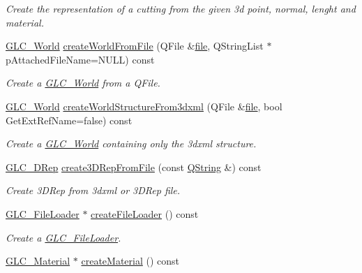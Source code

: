 \begin{DoxyCompactItemize}
\begin{DoxyCompactList}\small\item\em Create the representation of a cutting from the given 3d point, normal, lenght and material. \end{DoxyCompactList}\item 
\hyperlink{class_g_l_c___world}{G\-L\-C\-\_\-\-World} \hyperlink{class_g_l_c___factory_a0ca3d26bda97584f220eabfa43934410}{create\-World\-From\-File} (Q\-File \&\hyperlink{uavobjecttemplate_8m_a97c04efa65bcf0928abf9260bc5cbf46}{file}, Q\-String\-List $\ast$p\-Attached\-File\-Name=N\-U\-L\-L) const 
\begin{DoxyCompactList}\small\item\em Create a \hyperlink{class_g_l_c___world}{G\-L\-C\-\_\-\-World} from a Q\-File. \end{DoxyCompactList}\item 
\hyperlink{class_g_l_c___world}{G\-L\-C\-\_\-\-World} \hyperlink{class_g_l_c___factory_a9f5db8b22c52b376fce45422ce1e12a4}{create\-World\-Structure\-From3dxml} (Q\-File \&\hyperlink{uavobjecttemplate_8m_a97c04efa65bcf0928abf9260bc5cbf46}{file}, bool Get\-Ext\-Ref\-Name=false) const 
\begin{DoxyCompactList}\small\item\em Create a \hyperlink{class_g_l_c___world}{G\-L\-C\-\_\-\-World} containing only the 3dxml structure. \end{DoxyCompactList}\item 
\hyperlink{class_g_l_c__3_d_rep}{G\-L\-C\-\_\-D\-Rep} \hyperlink{class_g_l_c___factory_a567113bee0a4db892c7cb6e6b2d3bdc1}{create3\-D\-Rep\-From\-File} (const \hyperlink{group___u_a_v_objects_plugin_gab9d252f49c333c94a72f97ce3105a32d}{Q\-String} \&) const 
\begin{DoxyCompactList}\small\item\em Create 3\-D\-Rep from 3dxml or 3\-D\-Rep file. \end{DoxyCompactList}\item 
\hyperlink{class_g_l_c___file_loader}{G\-L\-C\-\_\-\-File\-Loader} $\ast$ \hyperlink{class_g_l_c___factory_a845ff89af102f0208412b5f47897ea77}{create\-File\-Loader} () const 
\begin{DoxyCompactList}\small\item\em Create a \hyperlink{class_g_l_c___file_loader}{G\-L\-C\-\_\-\-File\-Loader}. \end{DoxyCompactList}\item 
\hyperlink{class_g_l_c___material}{G\-L\-C\-\_\-\-Material} $\ast$ \hyperlink{class_g_l_c___factory_abc152d8b81c8ea84ed6fcb82d5ac868f}{create\-Material} () const 

\end{DoxyCompactItemize}

